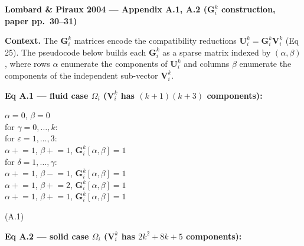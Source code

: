 \textbf{Lombard \& Piraux 2004 --- Appendix A.1, A.2 ($\boldsymbol{G}_i^k$ construction, paper pp.\ 30--31)}

\medskip

\textbf{Context.} The $\boldsymbol{G}_i^k$ matrices encode the
compatibility reductions $\boldsymbol{U}_i^k = \boldsymbol{G}_i^k
\boldsymbol{V}_i^k$ (Eq 25). The pseudocode below builds each
$\boldsymbol{G}_i^k$ as a sparse matrix indexed by $(\alpha, \beta)$,
where rows $\alpha$ enumerate the components of $\boldsymbol{U}_i^k$
and columns $\beta$ enumerate the components of the independent
sub-vector $\boldsymbol{V}_i^k$.

\medskip

\textbf{Eq A.1 --- fluid case $\Omega_i$ ($\boldsymbol{V}_i^k$ has
$(k+1)(k+3)$ components):}

\medskip

\begin{minipage}{\textwidth}\ttfamily\small
$\alpha = 0$, $\beta = 0$ \\
for $\gamma = 0, \ldots, k$: \\
\hphantom{ww}for $\varepsilon = 1, \ldots, 3$: \\
\hphantom{wwww}$\alpha \mathrel{+}= 1$, $\beta \mathrel{+}= 1$,
$\boldsymbol{G}_i^k[\alpha, \beta] = 1$ \\
\hphantom{ww}for $\delta = 1, \ldots, \gamma$: \\
\hphantom{wwww}$\alpha \mathrel{+}= 1$, $\beta \mathrel{-}= 1$,
$\boldsymbol{G}_i^k[\alpha, \beta] = 1$ \\
\hphantom{wwww}$\alpha \mathrel{+}= 1$, $\beta \mathrel{+}= 2$,
$\boldsymbol{G}_i^k[\alpha, \beta] = 1$ \\
\hphantom{wwww}$\alpha \mathrel{+}= 1$, $\beta \mathrel{+}= 1$,
$\boldsymbol{G}_i^k[\alpha, \beta] = 1$ \\
\end{minipage}
\hfill (A.1)

\medskip

\textbf{Eq A.2 --- solid case $\Omega_i$ ($\boldsymbol{V}_i^k$ has
$2k^2 + 8k + 5$ components):}

\medskip

